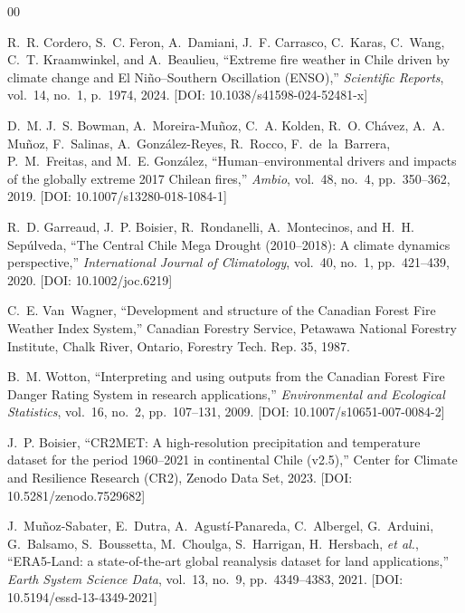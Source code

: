 \documentclass[10pt,conference]{IEEEtran}
\begin{document}
\begin{thebibliography}{00}
\footnotesize
\setlength{\itemsep}{1.2pt plus 0.5pt minus 0.5pt}

R.~R. Cordero, S.~C. Feron, A.~Damiani, J.~F. Carrasco, C.~Karas, C.~Wang, C.~T. Kraamwinkel, and A.~Beaulieu, ``Extreme fire weather in Chile driven by climate change and El Ni\~no--Southern Oscillation (ENSO),'' \textit{Scientific Reports}, vol.~14, no.~1, p.~1974, 2024. [DOI: 10.1038/s41598-024-52481-x]

D.~M. J.~S. Bowman, A.~Moreira-Mu\~noz, C.~A. Kolden, R.~O. Ch\'avez, A.~A. Mu\~noz, F.~Salinas, A.~Gonz\'alez-Reyes, R.~Rocco, F.~de~la~Barrera, P.~M.~Freitas, and M.~E. Gonz\'alez, ``Human--environmental drivers and impacts of the globally extreme 2017 Chilean fires,'' \textit{Ambio}, vol.~48, no.~4, pp.~350--362, 2019. [DOI: 10.1007/s13280-018-1084-1]

R.~D. Garreaud, J.~P. Boisier, R.~Rondanelli, A.~Montecinos, and H.~H. Sep\'ulveda, ``The Central Chile Mega Drought (2010--2018): A climate dynamics perspective,'' \textit{International Journal of Climatology}, vol.~40, no.~1, pp.~421--439, 2020. [DOI: 10.1002/joc.6219]

C.~E. Van~Wagner, ``Development and structure of the Canadian Forest Fire Weather Index System,'' Canadian Forestry Service, Petawawa National Forestry Institute, Chalk River, Ontario, Forestry Tech. Rep. 35, 1987.

B.~M. Wotton, ``Interpreting and using outputs from the Canadian Forest Fire Danger Rating System in research applications,'' \textit{Environmental and Ecological Statistics}, vol.~16, no.~2, pp.~107--131, 2009. [DOI: 10.1007/s10651-007-0084-2]

J.~P. Boisier, ``CR2MET: A high-resolution precipitation and temperature dataset for the period 1960--2021 in continental Chile (v2.5),'' Center for Climate and Resilience Research (CR2), Zenodo Data Set, 2023. [DOI: 10.5281/zenodo.7529682]

J.~Mu\~noz-Sabater, E.~Dutra, A.~Agust\'i-Panareda, C.~Albergel, G.~Arduini, G.~Balsamo, S.~Boussetta, M.~Choulga, S.~Harrigan, H.~Hersbach, \textit{et al.}, ``ERA5-Land: a state-of-the-art global reanalysis dataset for land applications,'' \textit{Earth System Science Data}, vol.~13, no.~9, pp.~4349--4383, 2021. [DOI: 10.5194/essd-13-4349-2021]


\end{thebibliography}
\end{document}
